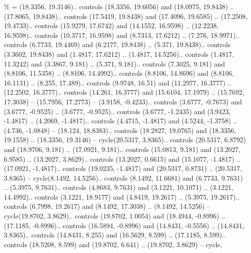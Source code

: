 {\%} = {(18.3356, 19.3146).. controls (18.3356, 19.6056) and (18.0975, 19.8438) .. (17.8065, 19.8438).. controls (17.5419, 19.8438) and (17.4096, 19.6585) .. (17.2508, 19.4733).. controls (15.9279, 17.6742) and (14.1552, 16.9598) .. (12.2238, 16.9598).. controls (10.3717, 16.9598) and (8.7313, 17.6212) .. (7.276, 18.9971).. controls (6.7733, 19.4469) and (6.2177, 19.8438) .. (5.371, 19.8438).. controls (3.3602, 19.8438) and (1.4817, 17.6212) .. (1.4817, 14.5256).. controls (1.4817, 11.3242) and (3.3867, 9.181) .. (5.371, 9.181).. controls (7.3025, 9.181) and (8.8106, 11.5358) .. (8.8106, 14.4992).. controls (8.8106, 14.8696) and (8.8106, 16.1131) .. (8.255, 17.489).. controls (9.9748, 16.51) and (11.2977, 16.3777) .. (12.2502, 16.3777).. controls (14.261, 16.3777) and (15.6104, 17.1979) .. (15.7692, 17.3038) -- (15.7956, 17.2773) -- (3.9158, -0.4233).. controls (3.6777, -0.7673) and (3.6777, -0.9525) .. (3.6777, -0.9525).. controls (3.6777, -1.2435) and (3.9423, -1.4817) .. (4.2069, -1.4817).. controls (4.4715, -1.4817) and (4.5244, -1.3758) .. (4.736, -1.0848) -- (18.124, 18.8383).. controls (18.2827, 19.0765) and (18.3356, 19.1558) .. (18.3356, 19.3146) -- cycle(20.5317, 3.8365).. controls (20.5317, 6.8792) and (18.9706, 9.181) .. (17.0921, 9.181).. controls (15.0813, 9.181) and (13.2027, 6.9585) .. (13.2027, 3.8629).. controls (13.2027, 0.6615) and (15.1077, -1.4817) .. (17.0921, -1.4817).. controls (19.0235, -1.4817) and (20.5317, 0.8731) .. (20.5317, 3.8365) -- cycle(8.1492, 14.5256).. controls (8.1492, 11.6681) and (6.7733, 9.7631) .. (5.3975, 9.7631).. controls (4.8683, 9.7631) and (3.1221, 10.1071) .. (3.1221, 14.4992).. controls (3.1221, 18.9177) and (4.8419, 19.2617) .. (5.3975, 19.2617).. controls (6.7998, 19.2617) and (8.1492, 17.3038) .. (8.1492, 14.5256) -- cycle(19.8702, 3.8629).. controls (19.8702, 1.0054) and (18.4944, -0.8996) .. (17.1185, -0.8996).. controls (16.5894, -0.8996) and (14.8431, -0.5556) .. (14.8431, 3.8365).. controls (14.8431, 8.255) and (16.5629, 8.599) .. (17.1185, 8.599).. controls (18.5208, 8.599) and (19.8702, 6.641) .. (19.8702, 3.8629) -- cycle},
